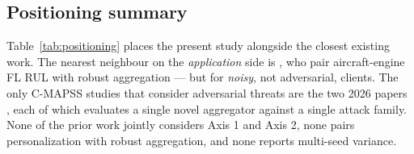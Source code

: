 \documentclass[a4paper,fleqn,doubleblind]{cas-sc}
\begin{document}
\subsection{Positioning summary}
\label{subsec:related-positioning}

Table~\ref{tab:positioning} places the present study alongside
the closest existing work. The nearest neighbour on the
\emph{application} side is \citet{Landau2025CollabRUL}, who pair
aircraft-engine FL RUL with robust aggregation --- but for
\emph{noisy}, not adversarial, clients. The only C-MAPSS studies that
consider adversarial threats are the two 2026 papers
\citep{Tallat2026BioMutFedPlus, Li2026TrustworthyFLIIoT}, each
of which evaluates a single novel aggregator against a single
attack family. None of the prior work jointly considers Axis 1
and Axis 2, none pairs personalization with robust aggregation, and
none reports multi-seed variance.
\end{document}

